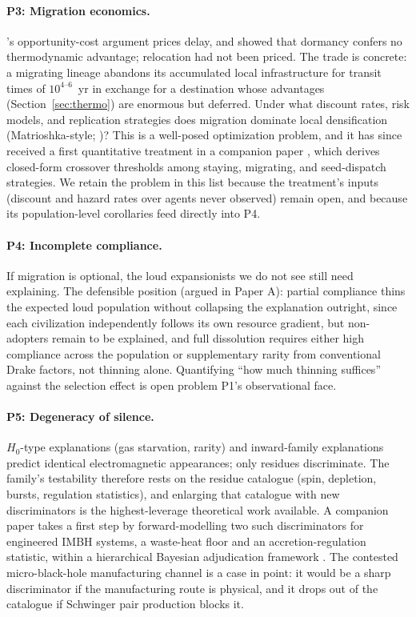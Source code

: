 \documentclass[11pt]{article}
\begin{document}
\paragraph{P3: Migration economics.} \citet{Bostrom2003}'s opportunity-cost argument prices delay, and \citet{Bennett2019} showed that dormancy confers no thermodynamic advantage; relocation had not been priced. The trade is concrete: a migrating lineage abandons its accumulated local infrastructure for transit times of $10^{4\text{--}6}$~yr in exchange for a destination whose advantages (Section~\ref{sec:thermo}) are enormous but deferred. Under what discount rates, risk models, and replication strategies does migration dominate local densification (Matrioshka-style; \citealt{Bradbury1999})? This is a well-posed optimization problem, and it has since received a first quantitative treatment in a companion paper \citep{Swanson2026Economics}, which derives closed-form crossover thresholds among staying, migrating, and seed-dispatch strategies. We retain the problem in this list because the treatment's inputs (discount and hazard rates over agents never observed) remain open, and because its population-level corollaries feed directly into P4.

\paragraph{P4: Incomplete compliance.} If migration is optional, the loud expansionists we do not see still need explaining. The defensible position (argued in Paper A): partial compliance thins the expected loud population without collapsing the explanation outright, since each civilization independently follows its own resource gradient, but non-adopters remain to be explained, and full dissolution requires either high compliance across the population or supplementary rarity from conventional Drake factors, not thinning alone. Quantifying ``how much thinning suffices'' against the \citet{Hanson2021} selection effect is open problem P1's observational face.

\paragraph{P5: Degeneracy of silence.} $H_0$-type explanations (gas starvation, rarity) and inward-family explanations predict identical electromagnetic appearances; only residues discriminate. The family's testability therefore rests on the residue catalogue (spin, depletion, bursts, regulation statistics), and enlarging that catalogue with new discriminators is the highest-leverage theoretical work available. A companion paper takes a first step by forward-modelling two such discriminators for engineered IMBH systems, a waste-heat floor and an accretion-regulation statistic, within a hierarchical Bayesian adjudication framework \citep{Swanson2026Engineered}. The contested micro-black-hole manufacturing channel \citep{AlvarezDominguez2024,Loeb2024Comment} is a case in point: it would be a sharp discriminator if the manufacturing route is physical, and it drops out of the catalogue if Schwinger pair production blocks it.
\end{document}
